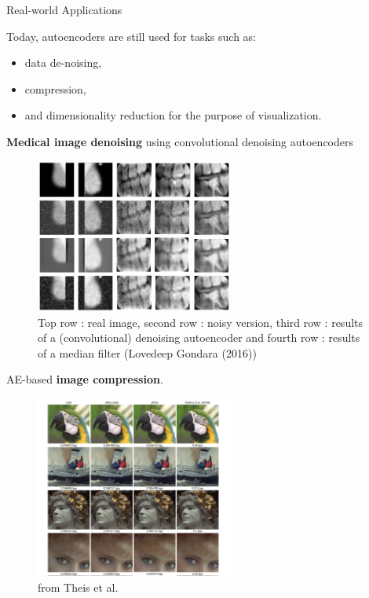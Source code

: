 \begin{vbframe}{Real-world Applications}

Today, autoencoders are still used for tasks such as: 
\begin{itemize}
\item  data de-noising,
\item  compression,
\item and dimensionality reduction for the purpose of visualization.
\end{itemize}

\framebreak 
  \textbf{Medical image denoising} using convolutional denoising autoencoders
  \begin{figure}
    \centering
    \includegraphics[width=6.5cm]{plots/denoising_autoencoder_application.png}
    \caption{Top row : real image, second row   : noisy version, third row : results of a (convolutional) denoising autoencoder and fourth row : results of a median filter (Lovedeep Gondara (2016))}
  \end{figure}
  
  \framebreak
  AE-based \textbf{image compression}.
  \begin{figure}
    \centering
    \includegraphics[width=6.5cm]{plots/image-compression.png}
    \caption{from Theis et al.}
    \end{figure}
  
  
\end{vbframe}


\endlecture

